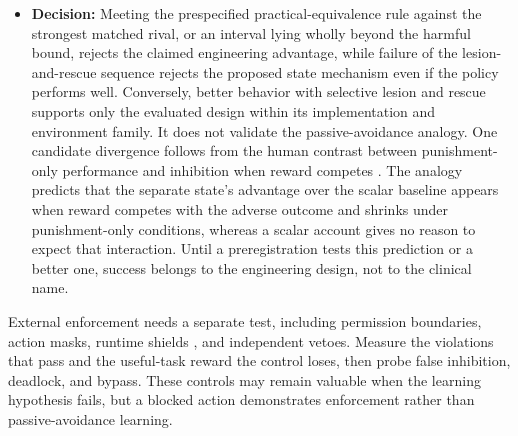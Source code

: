 \documentclass{article}
\begin{document}
\begin{itemize}
    \item \textbf{Decision:} Meeting the prespecified practical-equivalence rule against the strongest matched rival, or an interval lying wholly beyond the harmful bound, rejects the claimed engineering advantage, while failure of the lesion-and-rescue sequence rejects the proposed state mechanism even if the policy performs well. Conversely, better behavior with selective lesion and rescue supports only the evaluated design within its implementation and environment family. It does not validate the passive-avoidance analogy. One candidate divergence follows from the human contrast between punishment-only performance and inhibition when reward competes \citep{ref54}. The analogy predicts that the separate state's advantage over the scalar baseline appears when reward competes with the adverse outcome and shrinks under punishment-only conditions, whereas a scalar account gives no reason to expect that interaction. Until a preregistration tests this prediction or a better one, success belongs to the engineering design, not to the clinical name.
\end{itemize}

External enforcement needs a separate test, including permission boundaries, action masks, runtime shields \citep{ref41}, and independent vetoes. Measure the violations that pass and the useful-task reward the control loses, then probe false inhibition, deadlock, and bypass. These controls may remain valuable when the learning hypothesis fails, but a blocked action demonstrates enforcement rather than passive-avoidance learning.
\end{document}

